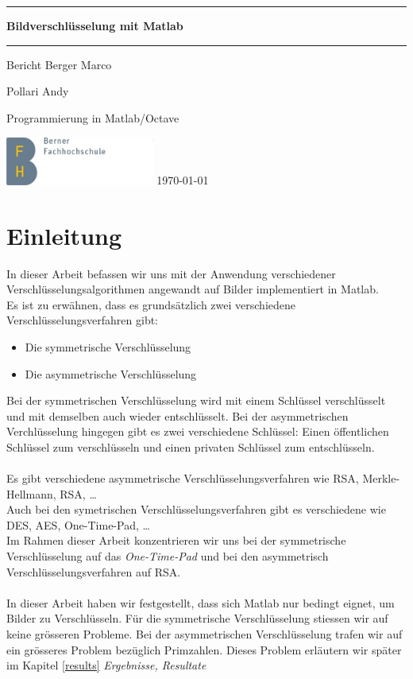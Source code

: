 \documentclass[paper=a4,fontsize=12pt]{scrartcl}
\begin{document}
\thispagestyle{empty}
\newcommand{\Rule}{\rule{\textwidth}{1mm}}
\begin{center}
\Rule\vspace{5mm}
\sffamily\bfseries\Huge
Bildverschlüsselung mit Matlab
\vspace{1mm}\Rule
\vfill
\LARGE Bericht
\vfill
\Large Berger Marco \par
\Large Pollari Andy \par
\Large Programmierung in Matlab/Octave\par
\vfill
\includegraphics[height=16mm]{img/logo_bfh_de.jpg}
\vfill
\today
\end{center}
\newpage


\section{Einleitung}
In dieser Arbeit befassen wir uns mit der Anwendung verschiedener Verschlüsselungsalgorithmen
angewandt auf Bilder implementiert in Matlab. \\
Es ist zu erwähnen, dass es grundsätzlich zwei verschiedene Verschlüsselungsverfahren gibt:
\begin{itemize}
  \item Die symmetrische Verschlüsselung 
  \item Die asymmetrische Verschlüsselung 
\end{itemize}
Bei der symmetrischen Verschlüsselung wird mit einem Schlüssel verschlüsselt und mit demselben auch wieder entschlüsselt.
Bei der asymmetrischen Verchlüsselung hingegen gibt es zwei verschiedene Schlüssel: Einen öffentlichen Schlüssel zum verschlüsseln
und einen privaten Schlüssel zum entschlüsseln. \\ \\
Es gibt verschiedene asymmetrische Verschlüsselungsverfahren wie RSA, Merkle-Hellmann, RSA, \ldots \\
Auch bei den symetrischen Verschlüsselungsverfahren gibt es verschiedene wie DES, AES, One-Time-Pad, \ldots \\
Im Rahmen dieser Arbeit konzentrieren wir uns bei der symmetrische Verschlüsselung auf das \textit{One-Time-Pad} 
und bei den asymmetrisch Verschlüsselungsverfahren auf RSA. \\ \\
In dieser Arbeit haben wir festgestellt, dass sich Matlab nur bedingt eignet, um Bilder zu Verschlüsseln.
Für die symmetrische Verschlüsselung stiessen wir auf keine grösseren Probleme. Bei der asymmetrischen Verschlüsselung
trafen wir auf ein grösseres Problem bezüglich Primzahlen. Dieses Problem erläutern wir später im Kapitel \ref{results} \textit{Ergebnisse, Resultate}
\end{document}
